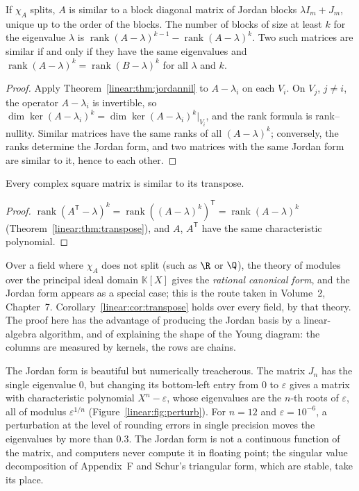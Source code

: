 \begin{corollary}\label{linear:cor:jordan}
If $\chi_A$ splits, $A$ is similar to a block diagonal matrix of Jordan blocks $\lambda I_m+J_m$, unique up to the order of
the blocks. The number of blocks of size at least $k$ for the eigenvalue $\lambda$ is
$\operatorname{rank}(A-\lambda)^{k-1}-\operatorname{rank}(A-\lambda)^k$. Two such matrices are similar if and only if
they have the same eigenvalues and $\operatorname{rank}(A-\lambda)^k=\operatorname{rank}(B-\lambda)^k$ for all $\lambda$ and $k$.
\end{corollary}
\begin{proof}
Apply Theorem~\ref{linear:thm:jordannil} to $A-\lambda_i$ on each $V_i$. On $V_j$, $j\ne i$, the operator $A-\lambda_i$ is invertible, so
$\dim\ker(A-\lambda_i)^k=\dim\ker(A-\lambda_i)^k|_{V_i}$, and the rank formula is rank--nullity. Similar matrices have the same
ranks of all $(A-\lambda)^k$; conversely, the ranks determine the Jordan form, and two matrices with the same Jordan form
are similar to it, hence to each other.
\end{proof}

\begin{corollary}\label{linear:cor:transpose}
Every complex square matrix is similar to its transpose.
\end{corollary}
\begin{proof}
$\operatorname{rank}(A^{\mathsf T}-\lambda)^k=\operatorname{rank}((A-\lambda)^k)^{\mathsf T}=\operatorname{rank}(A-\lambda)^k$
(Theorem~\ref{linear:thm:transpose}), and $A$, $A^{\mathsf T}$ have the same characteristic polynomial.
\end{proof}

\begin{remark}
Over a field where $\chi_A$ does not split (such as $\R$ or $\Q$), the theory of modules over the principal ideal
domain $\mathbb K[X]$ gives the \emph{rational canonical form}, and the Jordan form appears as a special case; this is
the route taken in Volume~2, Chapter~7. Corollary~\ref{linear:cor:transpose} holds over every field, by that theory. The proof here
has the advantage of producing the Jordan basis by a linear-algebra algorithm, and of explaining the shape of the Young
diagram: the columns are measured by kernels, the rows are chains.
\end{remark}

The Jordan form is beautiful but numerically treacherous. The matrix $J_n$ has the single eigenvalue $0$, but changing its
bottom-left entry from $0$ to $\varepsilon$ gives a matrix with characteristic polynomial $X^n-\varepsilon$, whose eigenvalues
are the $n$-th roots of $\varepsilon$, all of modulus $\varepsilon^{1/n}$ (Figure~\ref{linear:fig:perturb}). For $n=12$ and
$\varepsilon=10^{-6}$, a perturbation at the level of rounding errors in single precision moves the eigenvalues by more than $0.3$.
The Jordan form is not a continuous function of the matrix, and computers never compute it in floating point; the
singular value decomposition of Appendix~F and Schur's triangular form, which are stable, take its place.

